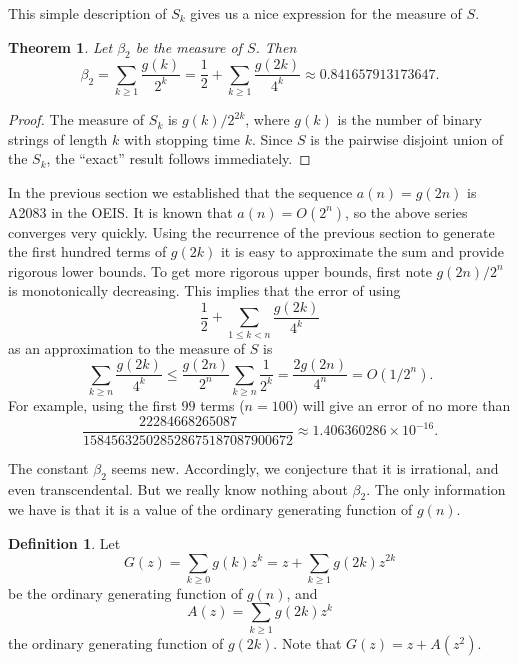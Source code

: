 \documentclass[12pt]{amsart}
\newtheorem{theorem}{Theorem}
\theoremstyle{definition}
\newtheorem{definition}{Definition}
\begin{document}
This simple description of $S_k$ gives us a nice expression for the measure of
$S$.

\begin{theorem}
    Let $\beta_2$ be the measure of $S$. Then
    \begin{equation*}
        \beta_2 = \sum_{k \geq 1} \frac{g(k)}{2^k} = \frac{1}{2} + \sum_{k \geq 1} \frac{g(2k)}{4^k}
        \approx 0.841657913173647.
    \end{equation*}
\end{theorem}

\begin{proof}
    The measure of $S_k$ is $g(k) / 2^{2k}$, where $g(k)$ is the number of
    binary strings of length $k$ with stopping time $k$. Since $S$ is the
    pairwise disjoint union of the $S_k$, the ``exact'' result follows
    immediately.
\end{proof}

In the previous section we established that the sequence $a(n) = g(2n)$ is
A2083 in the OEIS. It is known that $a(n) = O(2^n)$, so the above series
converges very quickly. Using the recurrence of the previous section to
generate the first hundred terms of $g(2k)$ it is easy to approximate the sum
and provide rigorous lower bounds. To get more rigorous upper bounds, first
note $g(2n) / 2^n$ is monotonically decreasing. This implies that the error of
using
\begin{equation*}
    \frac{1}{2} + \sum_{1 \leq k < n} \frac{g(2k)}{4^k}
\end{equation*}
as an approximation to the measure of $S$ is
\begin{equation*}
    \sum_{k \geq n} \frac{g(2k)}{4^k}
        \leq \frac{g(2n)}{2^n} \sum_{k \geq n} \frac{1}{2^k}
        = \frac{2g(2n)}{4^n}
        = O(1/2^n).
\end{equation*}
For example, using the first $99$ terms ($n = 100$) will give an error of no
more than
\begin{equation*}
    \frac{22284668265087}{158456325028528675187087900672}
    \approx 1.406360286 \times 10^{-16}.
\end{equation*}

The constant $\beta_2$ seems new. Accordingly, we conjecture that it is
irrational, and even transcendental. But we really know nothing about
$\beta_2$. The only information we have is that it is a value of the ordinary
generating function of $g(n)$.

\begin{definition}
    Let
    \begin{equation*}
        G(z) = \sum_{k \geq 0} g(k) z^k = z + \sum_{k \geq 1} g(2k) z^{2k}
    \end{equation*}
    be the ordinary generating function of $g(n)$, and
    \begin{equation*}
        A(z) = \sum_{k \geq 1} g(2k) z^k
    \end{equation*}
    the ordinary generating function of $g(2k)$. Note that $G(z) = z + A(z^2)$.
\end{definition}
\end{document}
